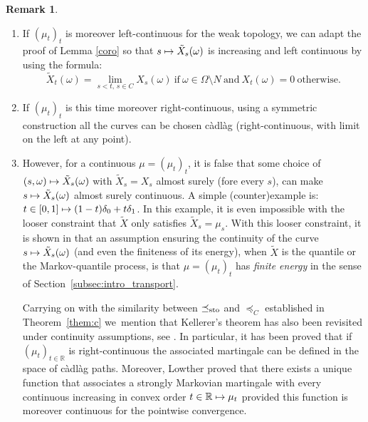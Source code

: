 \documentclass[JEP,XML,SOM,Unicode,NoEqCountersInSection,NoFloatCountersInSection,published]{cedram}
\newcommand\mto{\mathchoice{\longmapsto}{\mapsto}{\mapsto}{\mapsto}}
\theoremstyle{plain}
\theoremstyle{definition}
\newtheorem{rem}[them]{Remark}
\newcommand{\R}{\mathbb{R}}
\newcommand{\leqc}{\preceq_{C}}
\newcommand{\leqs}{\preceq_{\text{\rm sto}}}
\begin{document}
\skpt
\begin{rem}
\begin{enumerate}
\item
If $(\mu_t)_t$ is moreover left-continuous for the weak topology, we can adapt the proof of Lemma \ref{coro} so that $s\mto \tilde X_s(\omega)$ is increasing and left continuous by using the formula:\vspace*{-3pt}
\[\tilde X_t(\omega)=\lim_{s<t,\,s\in C}X_s(\omega)\ \text{if}\ \omega \in \Omega\setminus N\ \text{and}\ X_t(\omega)=0\ \text{otherwise}.\]

\item
If $(\mu_t)_t$ is this time moreover right-continuous, using a symmetric construction all the curves can be chosen càdlàg (right-continuous, with limit on the left at any point).

\item
However, for a continuous $\mu=(\mu_t)_t$, it is false that some choice of $(s,\omega)\mto \tilde X_s(\omega)$ with $\tilde X_s=X_s$ almost surely (fore every $s$), can make $s\mto \tilde X_s(\omega)$ almost surely continuous. A simple (counter)example is: $t\in [0,1]\mto (1-t)\delta_0+t \delta_1$. In this example, it is even impossible with the looser constraint that $\tilde X$ only satisfies $\tilde X_s=\mu_s$. With this looser constraint, it is shown in \cite{BouJui2} that an assumption ensuring the continuity of the curve $s\mto \tilde X_s(\omega)$ (and even the finiteness of its energy), when $\tilde X$ is the quantile or the Markov-quantile process, is that $\mu=(\mu_t)_t$ has \emph{finite energy} in the sense of Section~\ref{subsec:intro_transport}.

Carrying on with the similarity between $\leqs$ and $\leqc$ established in Theorem~\ref{them:c} we~mention that Kellerer's theorem has also been revisited under continuity assumptions, see \cite{Low,HiRoYo14,BHS}. In particular, it has been proved that if $(\mu_t)_{t\in \R}$ is right-continuous the associated martingale can be defined in the space of càdlàg paths. Moreover, Lowther proved \cite[Th.\,1.5]{Low2} that there exists a unique function that associates a strongly Markovian martingale with every continuous increasing in convex order $t\in \R\mto \mu_t$ provided this function is moreover continuous for the pointwise convergence.
\end{enumerate}
\end{rem}

\label{subsec:proof_lemmas}
\end{document}
